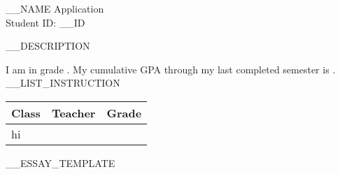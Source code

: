 \begin{center}
  {\LARGE __NAME Application} \\
  Student ID: __ID
\end{center}
__DESCRIPTION
\begin{questions}
  \question I am in grade \fillin.
  \question My cumulative GPA through my last completed semester is \fillin.
  \question __LIST_INSTRUCTION \\
  \begin{tabularx}{.9\textwidth}{X|X|r}
    Class & Teacher & Grade \\ \hline
    \parbox[][1.25in]{0pt}{hi} & & \\
  \end{tabularx}
  __ESSAY_TEMPLATE
  
\end{questions}
\begin{center}
\end{center}
